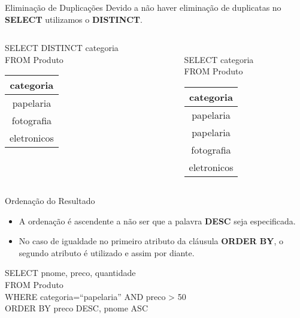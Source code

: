 \documentclass[aspectratio=169]{beamer}
\begin{document}
			\begin{frame}{Eliminação de Duplicações}
				Devido a não haver eliminação de duplicatas no \textbf{SELECT} utilizamos o \textbf{DISTINCT}.
				\BlankLine
				\begin{columns}[c]
					\begin{column}[c]{.48\textwidth}	
						{\ttfamily
							SELECT DISTINCT categoria\\
							FROM Produto\\
						}
						
						\begin{table}
							\begin{tabular}{|c|}
								\toprule
								\textbf{categoria} \\ \midrule
								    papelaria      \\ \midrule
								    fotografia     \\ \midrule
								   eletronicos     \\ \bottomrule
							\end{tabular}
						\end{table}
					\end{column}
			
					\begin{column}[c]{.48\textwidth}	\\
						{\ttfamily
							SELECT categoria\\
							FROM Produto\\
						}
						
						\begin{table}
							\begin{tabular}{|c|}
								\toprule
								\textbf{categoria} \\ \midrule
								    papelaria      \\ \midrule
								    papelaria      \\ \midrule
								    fotografia     \\ \midrule
								   eletronicos     \\ \bottomrule
							\end{tabular}
						\end{table}
					\end{column}
				\end{columns}
			\end{frame}
	
	
			\begin{frame}{Ordenação do Resultado}
				\begin{itemize}
					\item A ordenação é ascendente a não ser que a palavra \textbf{DESC} seja especificada.
					\item No caso de igualdade no primeiro atributo da cláusula \textbf{ORDER BY}, o segundo atributo é utilizado e assim por diante.
				\end{itemize}
			
				{\ttfamily
					SELECT pnome, preco, quantidade\\
					FROM Produto\\
					WHERE categoria=``papelaria'' AND preco > 50\\
					ORDER BY preco DESC, pnome ASC
				}
			\end{frame}
	
\end{document}
